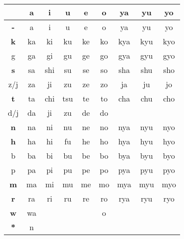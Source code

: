 



\LARGE

\begin{center}

\begin{tabular}{c||c|c|c|c|c||c|c|c|}
&
\textbf{\large a}&
\textbf{\large i}&
\textbf{\large u}&
\textbf{\large e}&
\textbf{\large o}&
\textbf{\small ya}&
\textbf{\small yu}&
\textbf{\small yo}\\
\hline 
\hline 
\textbf{\large -}&
a&
i&
u&
e&
o&
ya&
yu&
yo\\
\hline 
\textbf{\large k}&
ka&
ki&
ku&
ke&
ko&
kya&
kyu&
kyo\\
{\small g}&
ga&
gi&
gu&
ge&
go&
gya&
gyu&
gyo\\
\hline 
\textbf{\large s}&
sa&
shi&
su&
se&
so&
sha&
shu&
sho\\
{\small z/j}&
za&
ji&
zu&
ze&
zo&
ja&
ju&
jo\\
\hline 
\textbf{\large t}&
ta&
chi&
tsu&
te&
to&
cha&
chu&
cho\\
{\small d/j}&
da&
ji&
zu&
de&
do&
&
&
\\
\hline 
\textbf{\large n}&
na&
ni&
nu&
ne&
no&
nya&
nyu&
nyo\\
\hline 
\textbf{\large h}&
ha&
hi&
fu&
he&
ho&
hya&
hyu&
hyo\\
{\small b}&
ba&
bi&
bu&
be&
bo&
bya&
byu&
byo\\
{\small p}&
pa&
pi&
pu&
pe&
po&
pya&
pyu&
pyo\\
\hline 
\textbf{\large m}&
ma&
mi&
mu&
me&
mo&
mya&
myu&
myo\\
\hline 
\textbf{\large r}&
ra&
ri&
ru&
re&
ro&
rya&
ryu&
ryo\\
\hline 
\textbf{\large w}&
wa&
&
&
&
o&
&
&
\\
\hline 
\textbf{\large {*}}&
n&
&
&
&
&
&
&
\\
\hline 
\end{tabular}
\end{center}
